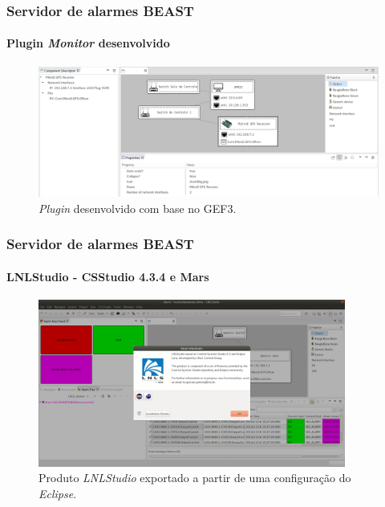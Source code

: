 \begin{frame}
\frametitle{Servidor de alarmes BEAST}
\framesubtitle{Plugin \textit{Monitor} desenvolvido}
\begin{figure}[h]
\centering
\includegraphics[width=\textwidth]{image/plugin}
\caption {\textit{Plugin} desenvolvido com base no GEF3.}
\label{fig:plugin}
\end{figure}

\end{frame}



\begin{frame}
\frametitle{Servidor de alarmes BEAST}
\framesubtitle{LNLStudio - CSStudio 4.3.4 e Mars}
\begin{figure}[h]
\centering
\includegraphics[width=0.90\textwidth]{image/lnlstudio}
\caption {\centering Produto \textit{LNLStudio} exportado a partir de uma
configuração do \textit{Eclipse}.}
\label{fig:lnlstudio}
\end{figure}

\end{frame}
